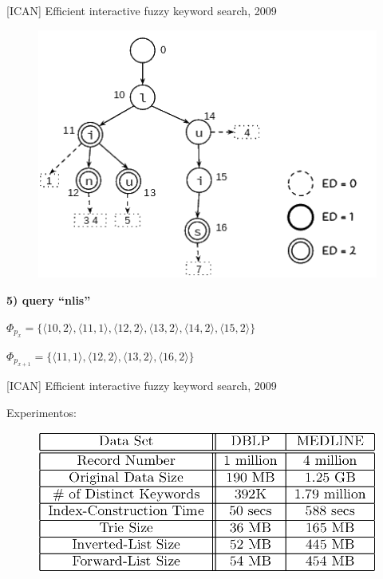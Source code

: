 \documentclass[11pt]{beamer}
\begin{document}
\begin{frame}{[ICAN] Efficient interactive fuzzy keyword search, 2009}

    \begin{figure}
      \includegraphics[scale=0.45]{pictures/ican_6.png}
      \centering
    \end{figure}
    
    \textbf{5) query ``nlis''}
    
    $\Phi_{p_{x}} = \big\{ \big \langle 10, 2 \big \rangle, \big \langle 11, 1 \big \rangle, \big \langle 12, 2 \big \rangle, \big \langle 13, 2 \big \rangle, \big \langle 14, 2 \big \rangle, \big \langle 15, 2 \big \rangle \big\}$
    
    $\Phi_{p_{x+1}} = \big\{ \big \langle 11, 1 \big \rangle, \big \langle 12, 2 \big \rangle, \big \langle 13, 2 \big \rangle, \big \langle 16, 2 \big \rangle \big\}$
    
\end{frame}

\begin{frame}{[ICAN] Efficient interactive fuzzy keyword search, 2009}

    Experimentos:

    \begin{figure}
      \includegraphics[scale=0.33]{pictures/icpan_2_ex.png}
      \centering
    \end{figure}
    
\end{frame}
\end{document}

